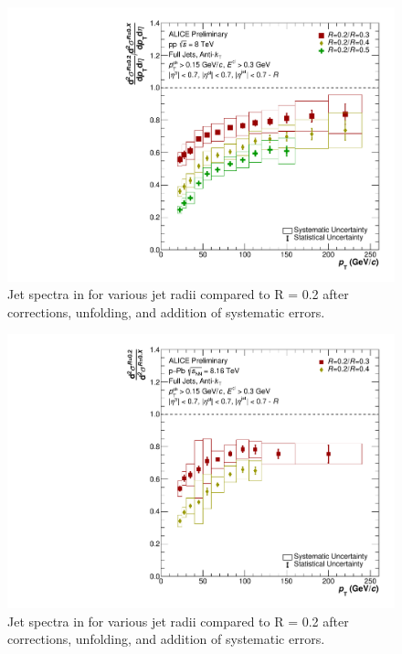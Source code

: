 \begin{figure}
    \centering
    \includegraphics[width=15cm]{figures/FinalResults/Bayes_reg6_Ratio.pdf}
    \caption{Jet spectra in \pp for various jet radii compared to R = 0.2 after corrections, unfolding, and addition of systematic errors.}
    \label{fig:finalSpectraRatios}
\end{figure}

\begin{figure}
    \centering
    \includegraphics[width=15cm]{figures/pPbFigures/FinalResults/Bayes_reg6_Ratio.pdf}
    \caption{Jet spectra in \pPb for various jet radii compared to R = 0.2 after corrections, unfolding, and addition of systematic errors.}
    \label{fig:finalSpectraRatiospPb}
\end{figure}

